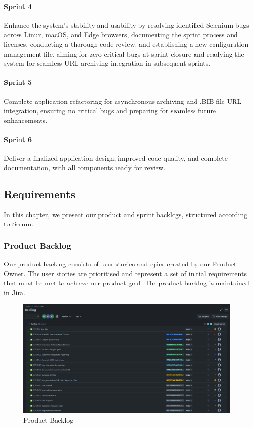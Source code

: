 \paragraph{Sprint 4}
Enhance the system's stability and usability by resolving identified Selenium bugs across Linux, macOS, and Edge browsers, documenting the sprint process and licenses, conducting a thorough code review, and establishing a new configuration management file, aiming for zero critical bugs at sprint closure and readying the system for seamless URL archiving integration in subsequent sprints.

\paragraph{Sprint 5}
Complete application refactoring for asynchronous archiving and .BIB file URL integration, ensuring no critical bugs and preparing for seamless future enhancements.

\paragraph{Sprint 6}
Deliver a finalized application design, improved code quality, and complete documentation, with all components ready for review.

\clearpage

\subsection{Requirements}
In this chapter, we present our product and sprint backlogs, structured according to Scrum.

\subsubsection{Product Backlog}
Our product backlog consists of user stories and epics created by our Product Owner.
The user stories are prioritised and represent a set of initial requirements that must be met to achieve our product goal.
The product backlog is maintained in Jira.
\begin{figure}[h!]
    \centering
    \includegraphics[width=1\textwidth]{pictures/backlog}
    \caption{Product Backlog}
    \label{fig:backlog}
\end{figure}

